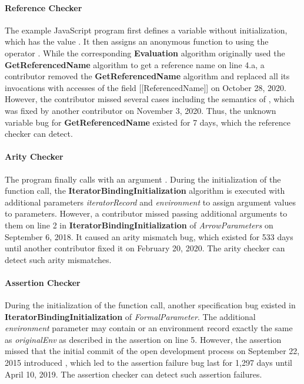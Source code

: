 \paragraph{Reference Checker} The example JavaScript program first defines a
variable  without initialization, which has the value .
It then assigns an anonymous function to  using the operator .
While the corresponding \textbf{Evaluation} algorithm originally
used the \textbf{GetReferencedName} algorithm to get a reference name on line 4.a,
a contributor removed the \textbf{GetReferencedName} algorithm and replaced all its
invocations with accesses of the field [[ReferencedName]] on October 28, 2020.
However, the contributor missed several cases including the semantics of
, which was fixed by another contributor on November 3, 2020.
Thus, the unknown variable bug for \textbf{GetReferencedName} existed for 7 days,
which the reference checker can detect.

\paragraph{Arity Checker} The program finally calls  with an argument .
During the initialization of the function call, the \textbf{IteratorBindingInitialization}
algorithm is executed with additional parameters \textit{iteratorRecord} and
\textit{environment} to assign argument values to parameters.
However, a contributor missed passing additional arguments to them on line 2 in
\textbf{IteratorBindingInitialization} of \textit{ArrowParameters} on September 6, 2018.
It caused an arity mismatch bug, which existed for 533 days until another
contributor fixed it on February 20, 2020. The arity checker can detect such arity mismatches.

\paragraph{Assertion Checker} During the initialization of the function call,
another specification bug existed in \textbf{IteratorBindingInitialization} of
\textit{FormalParameter}.  The additional \textit{environment} parameter may
contain  or an environment record exactly the same as
\textit{originalEnv} as described in the assertion on line 5.
However, the assertion missed that the initial commit
of the open development process on September 22, 2015 introduced
, which led to the assertion failure bug last for 1,297 days until April 10, 2019.
The assertion checker can detect such assertion failures.


